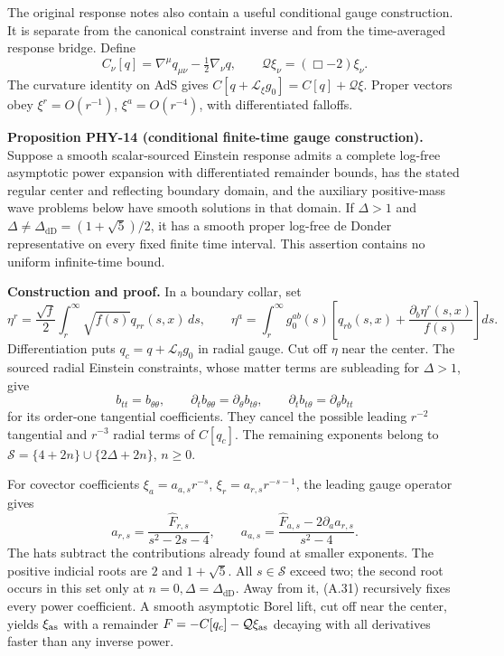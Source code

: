 \documentclass[a4paper,11pt]{article}
\numberwithin{equation}{section}
\begin{document}
The original response notes also contain a useful conditional gauge construction. It is separate from the canonical constraint inverse and from the time-averaged response bridge. Define \[
C_\nu[q]=\nabla^\mu q_{\mu\nu}-\tfrac12\nabla_\nu q,
\qquad \mathcal Q\xi_\nu=(\Box-2)\xi_\nu .
\] The curvature identity on AdS gives \(C[q+\mathcal L_\xi g_0]=C[q]+\mathcal Q\xi\). Proper vectors obey \(\xi^r=O(r^{-1})\), \(\xi^a=O(r^{-4})\), with differentiated falloffs.

\textbf{Proposition PHY-14 (conditional finite-time gauge construction).} Suppose a smooth scalar-sourced Einstein response admits a complete log-free asymptotic power expansion with differentiated remainder bounds, has the stated regular center and reflecting boundary domain, and the auxiliary positive-mass wave problems below have smooth solutions in that domain. If \(\Delta>1\) and \(\Delta\ne\Delta_{\mathrm{dD}}=(1+\sqrt5)/2\), it has a smooth proper log-free de Donder representative on every fixed finite time interval. This assertion contains no uniform infinite-time bound.

\textbf{Construction and proof.} In a boundary collar, set \[
\eta^r=\frac{\sqrt f}{2}\int_r^\infty\sqrt{f(s)}q_{rr}(s,x)\,ds,
\qquad
\eta^a=\int_r^\infty g_0^{ab}(s)
\left[q_{rb}(s,x)+\frac{\partial_b\eta^r(s,x)}{f(s)}\right]ds.
\tag{A.30}
\] Differentiation puts \(q_c=q+\mathcal L_\eta g_0\) in radial gauge. Cut off \(\eta\) near the center. The sourced radial Einstein constraints, whose matter terms are subleading for \(\Delta>1\), give \[
b_{tt}=b_{\theta\theta},\qquad
\partial_tb_{\theta\theta}=\partial_\theta b_{t\theta},\qquad
\partial_tb_{t\theta}=\partial_\theta b_{tt}
\] for its order-one tangential coefficients. They cancel the possible leading \(r^{-2}\) tangential and \(r^{-3}\) radial terms of \(C[q_c]\). The remaining exponents belong to \(\mathcal S=\{4+2n\}\cup\{2\Delta+2n\}\), \(n\ge0\).

For covector coefficients \(\xi_a=a_{a,s}r^{-s}\), \(\xi_r=a_{r,s}r^{-s-1}\), the leading gauge operator gives \[
a_{r,s}=\frac{\widehat F_{r,s}}{s^2-2s-4},\qquad
a_{a,s}=\frac{\widehat F_{a,s}-2\partial_aa_{r,s}}{s^2-4}.
\tag{A.31}
\] The hats subtract the contributions already found at smaller exponents. The positive indicial roots are \(2\) and \(1+\sqrt5\). All \(s\in\mathcal S\) exceed two; the second root occurs in this set only at \(n=0,\Delta=\Delta_{\mathrm{dD}}\). Away from it, (A.31) recursively fixes every power coefficient. A smooth asymptotic Borel lift, cut off near the center, yields \(\xi_{\rm as}\) with a remainder \(F=-C[q_c]-\mathcal Q\xi_{\rm as}\) decaying with all derivatives faster than any inverse power.
\end{document}
